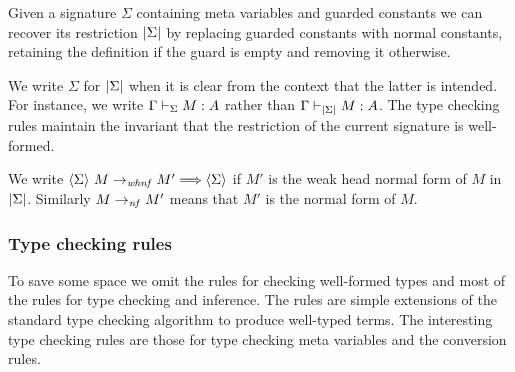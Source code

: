 \begin{definition}
    Given a signature $\Sigma$ containing meta variables and guarded constants
    we can recover its {\Core} restriction $\left|{\Sigma}\right|$ by replacing
    guarded constants with normal constants, retaining the definition if the
    guard is empty and removing it otherwise.
\end{definition}

We write $\Sigma$ for $\left|{\Sigma}\right|$ when it is clear from the context that
the latter is intended. For instance, we write ${\Gamma} \vdash_{\Sigma} {M} : {A}$
rather than ${\Gamma} \vdash_{\left|{\Sigma}\right|} {M} : {A}$. The type checking rules
maintain the invariant that the {\Core} restriction of the current signature is
well-formed.

We write $\langle {\Sigma} \rangle ~ {{M} \to_{\mathit{whnf}} {M'}} \Longrightarrow \langle {\Sigma} \rangle$ if $M'$ is the weak
head normal form of $M$ in $\left|{\Sigma}\right|$. Similarly ${M} \to_{\mathit{nf}} {M'}$
means that $M'$ is the normal form of $M$.

\subsubsection{Type checking rules}

To save some space we omit the rules for checking well-formed types and most of
the rules for type checking and inference. The rules are simple extensions of
the standard type checking algorithm to produce
well-typed terms. The interesting type checking rules are those for type
checking meta variables and the conversion rules.


